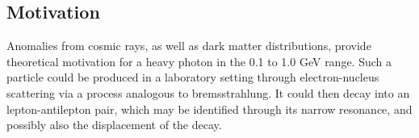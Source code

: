 \documentclass[b1]{sciposter}
\begin{document}
\begin{multicols}{3}
	\section*{Motivation}
Anomalies from cosmic rays\cite{NABO}, as well as dark matter distributions\cite{NABO}, provide theoretical motivation for a heavy photon in the 0.1 to 1.0 GeV range.  Such a particle could be produced in a laboratory setting through electron-nucleus scattering via a process analogous to bremsstrahlung.  It could then decay into an lepton-antilepton pair, which may be identified through its narrow resonance, and possibly also the displacement of the decay.




\end{multicols}
\end{document}
